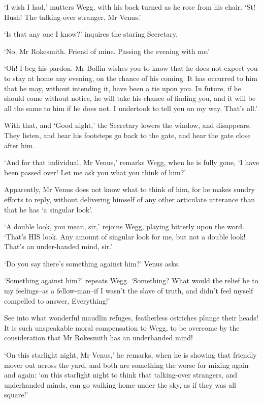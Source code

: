 ‘I wish I had,’ mutters Wegg, with his back turned as he rose from his
chair. ‘St! Hush! The talking-over stranger, Mr Venus.’

‘Is that any one I know?’ inquires the staring Secretary.

‘No, Mr Rokesmith. Friend of mine. Passing the evening with me.’

‘Oh! I beg his pardon. Mr Boffin wishes you to know that he does not
expect you to stay at home any evening, on the chance of his coming. It
has occurred to him that he may, without intending it, have been a tie
upon you. In future, if he should come without notice, he will take his
chance of finding you, and it will be all the same to him if he does
not. I undertook to tell you on my way. That’s all.’

With that, and ‘Good night,’ the Secretary lowers the window, and
disappears. They listen, and hear his footsteps go back to the gate, and
hear the gate close after him.

‘And for that individual, Mr Venus,’ remarks Wegg, when he is fully
gone, ‘I have been passed over! Let me ask you what you think of him?’

Apparently, Mr Venus does not know what to think of him, for he makes
sundry efforts to reply, without delivering himself of any other
articulate utterance than that he has ‘a singular look’.

‘A double look, you mean, sir,’ rejoins Wegg, playing bitterly upon the
word. ‘That’s HIS look. Any amount of singular look for me, but not a
double look! That’s an under-handed mind, sir.’

‘Do you say there’s something against him?’ Venus asks.

‘Something against him?’ repeats Wegg. ‘Something? What would the relief
be to my feelings--as a fellow-man--if I wasn’t the slave of truth, and
didn’t feel myself compelled to answer, Everything!’

See into what wonderful maudlin refuges, featherless ostriches plunge
their heads! It is such unspeakable moral compensation to Wegg, to be
overcome by the consideration that Mr Rokesmith has an underhanded mind!

‘On this starlight night, Mr Venus,’ he remarks, when he is showing that
friendly mover out across the yard, and both are something the worse
for mixing again and again: ‘on this starlight night to think that
talking-over strangers, and underhanded minds, can go walking home under
the sky, as if they was all square!’

